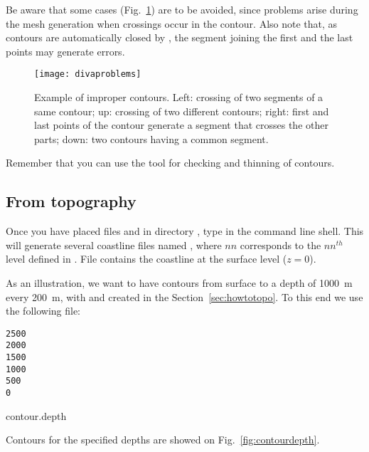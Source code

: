 Be aware that some cases (Fig.~\ref{divaprob}) are to be avoided, since problems arise during the mesh generation when crossings occur in the contour. Also note that, as contours are automatically closed by \diva, the segment joining the first and the last points may generate errors. 


\begin{figure}[H]
\centering
\parbox{.5\textwidth}{
\texttt{[image: divaproblems]}
}\parbox{.5\textwidth}{\caption[Example of improper contours.]{Example of improper contours. Left: crossing of two segments of a same contour; up: crossing of two different contours; right: first and last points of the contour generate a segment that crosses the other parts; down: two contours having a common segment.\label{divaprob}}
}
\end{figure}

Remember that you can use the tool  for checking and thinning of contours.


\subsection{From topography\label{sec:contourtopo}}


Once you have placed files  and  in directory , type  in the command line shell. This will generate several coastline files named , where $nn$ corresponds to the $nn^{th}$ level defined in . File  contains the coastline at the surface level ($z=0$).

As an illustration, we want to have contours from surface to a depth of \mbox{1000 m} every \mbox{200 m}, with  and  created in the Section~\ref{sec:howtotopo}. To this end we use the following file:

\begin{exfile}[htpb]
\begin{footnotesize}
\begin{verbatim}
2500
2000
1500
1000
500
0
\end{verbatim}
\end{footnotesize}
\caption{contour.depth\label{contourdepth}}
\end{exfile}

Contours for the specified depths are showed on Fig.~\ref{fig:contourdepth}.


